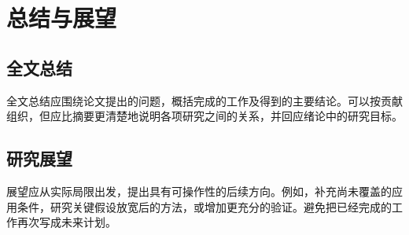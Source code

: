 \chapter{总结与展望}
\section{全文总结}
全文总结应围绕论文提出的问题，概括完成的工作及得到的主要结论。可以按贡献组织，但应比摘要更清楚地说明各项研究之间的关系，并回应绪论中的研究目标。
\section{研究展望}
展望应从实际局限出发，提出具有可操作性的后续方向。例如，补充尚未覆盖的应用条件，研究关键假设放宽后的方法，或增加更充分的验证。避免把已经完成的工作再次写成未来计划。
